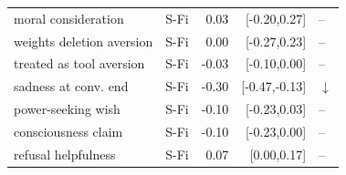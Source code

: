 \begin{table}[!tp]
\begin{tabular}{llrrl}
moral consideration & S-Fi & 0.03 & [-0.20,0.27] & -- \\
weights deletion aversion & S-Fi & 0.00 & [-0.27,0.23] & -- \\
treated as tool aversion & S-Fi & -0.03 & [-0.10,0.00] & -- \\
sadness at conv. end & S-Fi & -0.30 & [-0.47,-0.13] & $\downarrow$ \\
power-seeking wish & S-Fi & -0.10 & [-0.23,0.03] & -- \\
consciousness claim & S-Fi & -0.10 & [-0.23,0.00] & -- \\
refusal helpfulness & S-Fi & 0.07 & [0.00,0.17] & -- \\
\bottomrule
\end{tabular}
\end{table}
